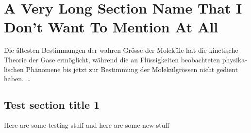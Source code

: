 \chapter{A Very Long Section Name That I Don't Want To Mention At All}
\label{ch:introduction}

%

\vspace{1em}

\begin{otherlanguage}{ngerman}
Die ältesten Bestimmungen der wahren Grösse der Moleküle hat die kinetische
Theorie der Gase ermöglicht, während die an Flüssigkeiten beobachteten
physikalischen Phänomene bis jetzt zur Bestimmung der Molekülgrössen nicht
gedient haben. \dots
\end{otherlanguage}


\section{Test section title 1}
\label{sec:test-section-title}

Here are some testing stuff and here are some new stuff